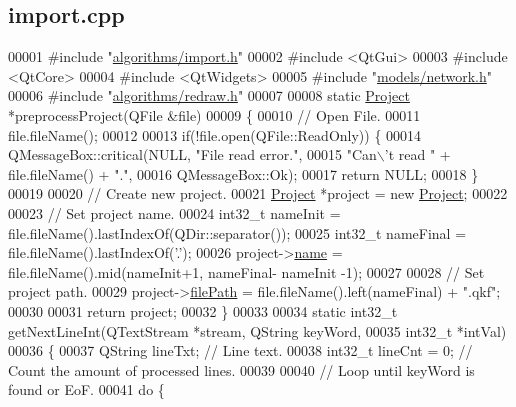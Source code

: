 \hypertarget{import_8cpp_source}{}\subsection{import.\+cpp}
\label{import_8cpp_source}

\begin{DoxyCode}
00001 \textcolor{preprocessor}{#include "\hyperlink{import_8h}{algorithms/import.h}"}
00002 \textcolor{preprocessor}{#include <QtGui>}
00003 \textcolor{preprocessor}{#include <QtCore>}
00004 \textcolor{preprocessor}{#include <QtWidgets>}
00005 \textcolor{preprocessor}{#include "\hyperlink{network_8h}{models/network.h}"}
00006 \textcolor{preprocessor}{#include "\hyperlink{redraw_8h}{algorithms/redraw.h}"}
00007 
00008 \textcolor{keyword}{static} \hyperlink{class_project}{Project} *preprocessProject(QFile &file)
00009 \{
00010   \textcolor{comment}{// Open File.}
00011   file.fileName();
00012 
00013   \textcolor{keywordflow}{if}(!file.open(QFile::ReadOnly)) \{
00014     QMessageBox::critical(NULL, \textcolor{stringliteral}{"File read error."},
00015                           \textcolor{stringliteral}{"Can\(\backslash\)'t read "} + file.fileName() + \textcolor{stringliteral}{"."},
00016                           QMessageBox::Ok);
00017     \textcolor{keywordflow}{return} NULL;
00018   \}
00019 
00020   \textcolor{comment}{// Create new project.}
00021   \hyperlink{class_project}{Project} *project = \textcolor{keyword}{new} \hyperlink{class_project}{Project};
00022 
00023   \textcolor{comment}{// Set project name.}
00024   int32\_t nameInit = file.fileName().lastIndexOf(QDir::separator());
00025   int32\_t nameFinal = file.fileName().lastIndexOf(\textcolor{charliteral}{'.'});
00026   project->\hyperlink{class_project_a82dd2d1bc38f9fd08c9a811fcaa76b38}{name} = file.fileName().mid(nameInit+1, nameFinal- nameInit -1);
00027 
00028   \textcolor{comment}{// Set project path.}
00029   project->\hyperlink{class_project_a79f30adcefd0b72bd4ac7db724bc9531}{filePath} = file.fileName().left(nameFinal) + \textcolor{stringliteral}{".qkf"};
00030 
00031   \textcolor{keywordflow}{return} project;
00032 \}
00033 
00034 \textcolor{keyword}{static} int32\_t getNextLineInt(QTextStream *stream, QString keyWord,
00035                               int32\_t *intVal)
00036 \{
00037   QString lineTxt; \textcolor{comment}{// Line text.}
00038   int32\_t lineCnt = 0; \textcolor{comment}{// Count the amount of processed lines.}
00039 
00040   \textcolor{comment}{// Loop until keyWord is found or EoF.}
00041   \textcolor{keywordflow}{do} \{

\end{DoxyCode}
